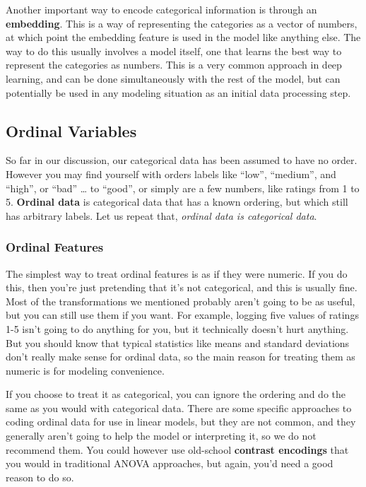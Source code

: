 \documentclass[
  letterpaper,
]{krantz}
\begin{document}
Another important way to encode categorical information is through an
\textbf{embedding}. This is a way of representing the categories as a
vector of numbers, at which point the embedding feature is used in the
model like anything else. The way to do this usually involves a model
itself, one that learns the best way to represent the categories as
numbers. This is a very common approach in deep learning, and can be
done simultaneously with the rest of the model, but can potentially be
used in any modeling situation as an initial data processing step.

\subsection{Ordinal Variables}\label{sec-data-ordinal}

So far in our discussion, our categorical data has been assumed to have
no order. However you may find yourself with orders labels like ``low'',
``medium'', and ``high'', or ``bad'' \ldots{} to ``good'', or simply are
a few numbers, like ratings from 1 to 5. \textbf{Ordinal data} is
categorical data that has a known ordering, but which still has
arbitrary labels. Let us repeat that, \emph{ordinal data is categorical
data}.

\subsubsection{Ordinal Features}\label{ordinal-features}

The simplest way to treat ordinal features is as if they were numeric.
If you do this, then you're just pretending that it's not categorical,
and this is usually fine. Most of the transformations we mentioned
probably aren't going to be as useful, but you can still use them if you
want. For example, logging five values of ratings 1-5 isn't going to do
anything for you, but it technically doesn't hurt anything. But you
should know that typical statistics like means and standard deviations
don't really make sense for ordinal data, so the main reason for
treating them as numeric is for modeling convenience.

If you choose to treat it as categorical, you can ignore the ordering
and do the same as you would with categorical data. There are some
specific approaches to coding ordinal data for use in linear models, but
they are not common, and they generally aren't going to help the model
or interpreting it, so we do not recommend them. You could however use
old-school \textbf{contrast encodings} that you would in traditional
ANOVA approaches, but again, you'd need a good reason to do so.
\end{document}
